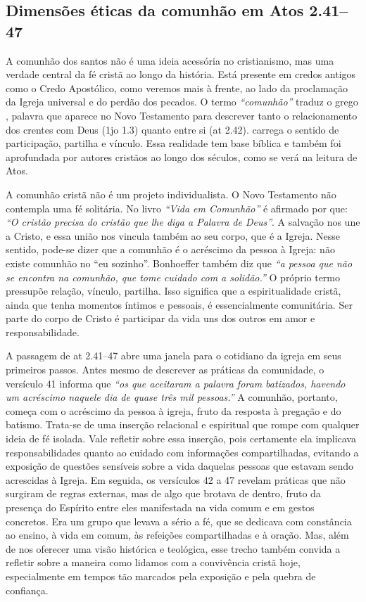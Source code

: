 \subsection{Dimensões éticas da comunhão em Atos 2.41–47}

A comunhão dos santos não é uma ideia acessória no cristianismo, mas uma verdade central da fé cristã ao longo da história. Está presente em credos antigos como o Credo Apostólico, como veremos mais à frente, ao lado da proclamação da Igreja universal e do perdão dos pecados. O termo \textit{``comunhão''} traduz o grego \textit{}, palavra que aparece no Novo Testamento para descrever tanto o relacionamento dos crentes com Deus (\gls{1jo} 1.3) quanto entre si (\gls{at} 2.42). \textit{} carrega o sentido de participação, partilha e vínculo. Essa realidade tem base bíblica e também foi aprofundada por autores cristãos ao longo dos séculos, como se verá na leitura de Atos.

A comunhão cristã não é um projeto individualista. O Novo Testamento não contempla uma fé solitária. No livro \textit{``Vida em Comunhão''} é afirmado por  que: \textit{``O cristão precisa do cristão que lhe diga a Palavra de Deus''}. A salvação nos une a Cristo, e essa união nos vincula também ao seu corpo, que é a Igreja. Nesse sentido, pode-se dizer que a comunhão é o acréscimo da pessoa à Igreja: não existe comunhão no ``eu sozinho''. Bonhoeffer também diz que \textit{``a pessoa que não se encontra na comunhão, que tome cuidado com a solidão.''} \cite[p.~59]{bonhoeffer1997} O próprio termo \textit{} pressupõe relação, vínculo, partilha. Isso significa que a espiritualidade cristã, ainda que tenha momentos íntimos e pessoais, é essencialmente comunitária. Ser parte do corpo de Cristo é participar da vida uns dos outros em amor e responsabilidade.

A passagem de \gls{at} 2.41–47 abre uma janela para o cotidiano da igreja em seus primeiros passos. Antes mesmo de descrever as práticas da comunidade, o versículo 41 informa que \textit{``os que aceitaram a palavra foram batizados, havendo um acréscimo naquele dia de quase três mil pessoas.''} A comunhão, portanto, começa com o acréscimo da pessoa à igreja, fruto da resposta à pregação e do batismo. Trata-se de uma inserção relacional e espiritual que rompe com qualquer ideia de fé isolada. Vale refletir sobre essa inserção, pois certamente ela implicava responsabilidades quanto ao cuidado com informações compartilhadas, evitando a exposição de questões sensíveis sobre a vida daquelas pessoas que estavam sendo acrescidas à Igreja. Em seguida, os versículos 42 a 47 revelam práticas que não surgiram de regras externas, mas de algo que brotava de dentro, fruto da presença do Espírito entre eles manifestada na vida comum e em gestos concretos. Era um grupo que levava a sério a fé, que se dedicava com constância ao ensino, à vida em comum, às refeições compartilhadas e à oração. Mas, além de nos oferecer uma visão histórica e teológica, esse trecho também convida a refletir sobre a maneira como lidamos com a convivência cristã hoje, especialmente em tempos tão marcados pela exposição e pela quebra de confiança.

